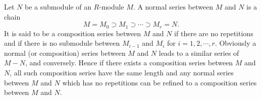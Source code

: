 Let $N$ be a submodule of an $R$-module $M$. A normal series between $M$ and $N$ is a chain
$$M = M_0 \supset M_1 \supset \cdots \supset M_r = N.$$
It is said to be a composition series between $M$ and $N$ if there are no repetitions and if there is no submodule between $M_{i-1}$ and $M_i$ for $i = 1, 2, \cdots, r$. Obviously a normal (or composition) series between $M$ and $N$ leads to a similar series of $M - N$, and conversely. Hence if there exists a composition series between $M$ and $N$, all such composition series have the same length and any normal series between $M$ and $N$ which has no repetitions can be refined to a composition series between $M$ and $N$.
